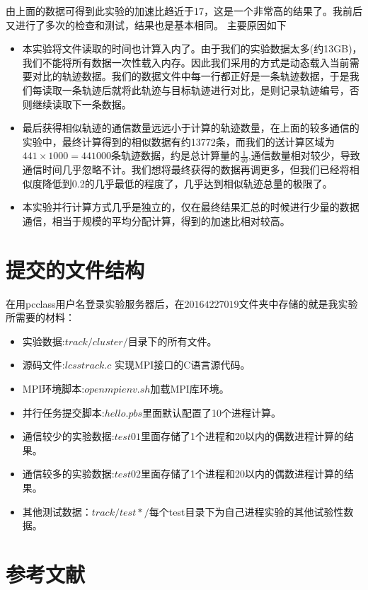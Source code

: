 \documentclass[UTF8]{ctexart}
\begin{document}
由上面的数据可得到此实验的加速比趋近于17，这是一个非常高的结果了。我前后又进行了多次的检查和测试，结果也是基本相同。
主要原因如下
\begin{itemize}
	\item 本实验将文件读取的时间也计算入内了。由于我们的实验数据太多(约13GB)，我们不能将所有数据一次性载入内存。因此我们采用的方式是动态载入当前需要对比的轨迹数据。我们的数据文件中每一行都正好是一条轨迹数据，于是我们每读取一条轨迹后就将此轨迹与目标轨迹进行对比，是则记录轨迹编号，否则继续读取下一条数据。
	\item 最后获得相似轨迹的通信数量远远小于计算的轨迹数量，在上面的较多通信的实验中，最终计算得到的相似数据有约13772条，而我们的送计算区域为$441\times1000=441000$条轨迹数据，约是总计算量的$\frac{1}{40}$,通信数量相对较少，导致通信时间几乎忽略不计。我们想将最终获得的数据再调更多，但我们已经将相似度降低到0.2的几乎最低的程度了，几乎达到相似轨迹总量的极限了。
	\item 本实验并行计算方式几乎是独立的，仅在最终结果汇总的时候进行少量的数据通信，相当于规模的平均分配计算，得到的加速比相对较高。
\end{itemize}

\section{提交的文件结构}\label{sec5}
在用pcclass用户名登录实验服务器后，在$20164227019$文件夹中存储的就是我实验所需要的材料：

\begin{itemize}
	\item 实验数据:$track/cluster/$目录下的所有文件。
	\item 源码文件:$lcsstrack.c$ 实现MPI接口的C语言源代码。
	\item MPI环境脚本:$openmpienv.sh$加载MPI库环境。
	\item 并行任务提交脚本:$hello.pbs$里面默认配置了10个进程计算。
	\item 通信较少的实验数据:$test01$里面存储了1个进程和20以内的偶数进程计算的结果。
	\item 通信较多的实验数据:$test02$里面存储了1个进程和20以内的偶数进程计算的结果。
	\item 其他测试数据：$track/test*/$每个test目录下为自己进程实验的其他试验性数据。
\end{itemize}

\section{参考文献}\label{sec:sec4}


\end{document}
